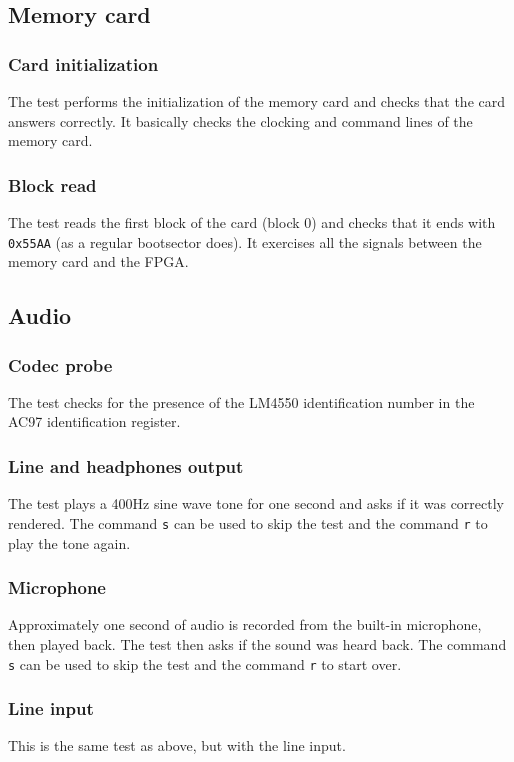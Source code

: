 \documentclass[a4paper,11pt]{article}
\begin{document}
\subsection{Memory card}
\subsubsection{Card initialization}
The test performs the initialization of the memory card and checks that the card answers correctly. It basically checks the clocking and command lines of the memory card.

\subsubsection{Block read}
The test reads the first block of the card (block 0) and checks that it ends with \verb!0x55AA! (as a regular bootsector does). It exercises all the signals between the memory card and the FPGA.

\subsection{Audio}
\subsubsection{Codec probe}
The test checks for the presence of the LM4550 identification number in the AC97 identification register.

\subsubsection{Line and headphones output}
The test plays a 400Hz sine wave tone for one second and asks if it was correctly rendered. The command \verb!s! can be used to skip the test and the command \verb!r! to play the tone again.

\subsubsection{Microphone}
Approximately one second of audio is recorded from the built-in microphone, then played back. The test then asks if the sound was heard back. The command \verb!s! can be used to skip the test and the command \verb!r! to start over.

\subsubsection{Line input}
This is the same test as above, but with the line input.
\end{document}
